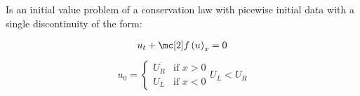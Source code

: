 \begin{defnbox}\nospacing
    \begin{defn}\label{defn:riemann_problem_rarefaction}
        Is an initial value problem of a conservation law with
        picewise initial data with a single discontinuity of the form:\\
        \begin{minipage}{0.4\textwidth}
            \begin{align}
            u_{t}+\flux \left(u\right)_{x}=0
            \end{align}
            \begin{align}
            u_{0}=\begin{cases}
                    U_{R}&\text{if }x>0\\
                    U_{L}&\text{if }x<0
                    \end{cases}
                    U_{L}<U_{R}
            \label{eq:riemann_problem}
            \end{align}
        \end{minipage}\hfil
        \begin{minipage}[c]{0.4\textwidth}
            \begin{figure}[H]
                \centering{
                  \def\svgwidth{100pt}
                  \resizebox{\linewidth}{!}{}
                }
            \end{figure}
        \end{minipage}
    \end{defn}
\end{defnbox}

